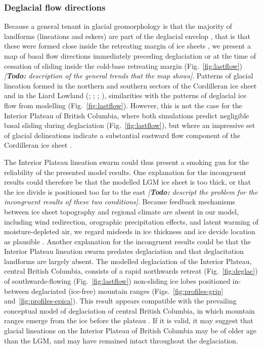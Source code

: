 \documentclass[tc, manuscript]{copernicus}
\newcommand{\todo}[1]{\emph{[\textbf{Todo:} #1]}}
\begin{document}
\subsubsection{Deglacial flow directions}

Because a general tenant in glacial geomorphology is that the majority of
landforms (lineations and eskers) are part of the deglacial envelop
\citep[terminology from]{Kleman.etal.2006}, that is that these were formed
close inside the retreating margin of ice sheets \citep{Boulton.Clark.1990,
Kleman.etal.1997, Kleman.etal.2010}, we present a map of basal flow directions
immediately preceding deglaciation or at the time of cessation of sliding
inside the cold-base retreating margin (Fig.~\ref{fig:lastflow})
\todo{description of the general trends that the map shows}. Patterns of
glacial lineation formed in the northern and southern sectors of the
Cordilleran ice sheet and in the Liard Lowland (\citealp{Prest.etal.1968};
\citealp[Fig.~1.12]{Clague.1989}; \citealp[Fig.~2]{Kleman.etal.2010};
\citealp[Fig.~2]{Margold.etal.2013}), similarities with the patterns of
deglacial ice flow from modelling (Fig.~\ref{fig:lastflow}). However, this is
not the case for the Interior Plateau of British Columbia, where both
simulations predict negligible basal sliding during deglaciation
(Fig.~\ref{fig:lastflow}), but where an impressive set of glacial delineations
indicate a substantial eastward flow component of the Cordilleran ice sheet
\citep{Prest.etal.1968, Kleman.etal.2010}.

The Interior Plateau lineation swarm could thus present a smoking gun for the
reliability of the presented model results. One explanation for the incongruent
results could therefore be that the modelled LGM ice sheet is too thick, or
that the ice divide is positioned too far to the east \todo{descript the
problem for the incongruent results of these two conditions}. Because feedback
mechanisms between ice sheet topography and regional climate are absent in our
model, including wind redirection, orographic precipitation effects, and latent
warming of moisture-depleted air, we regard misfeeds in ice thickness and ice
devide location as plausible \citep{Seguinot.etal.2014}. Another explanation
for the incongruent results could be that the Interior Plateau lineation swarm
predates deglaciation and that deglacitation landforms are largely absent. The
modelled deglaciation of the Interior Plateau, central British Columbia,
consists of a rapid northwards retreat (Fig.~\ref{fig:deglac}) of
southwards-flowing (Fig.~\ref{fig:lastflow}) non-sliding ice lobes positioned
in-between deglaciated (ice-free) mountain ranges
(Figs.~\ref{fig:profiles-grip} and~\ref{fig:profiles-epica}). This result
appears compatible with the prevailing conceptual model of deglaciation of
central British Columbia, in which mountain ranges emerge from the ice before
the plateau \citep[Fig.~7]{Fulton.1991}. If it is valid, it may suggest that
glacial lineations on the Interior Plateau of British Columbia may be of older
age than the LGM, and may have remained intact throughout the deglaciation.
\end{document}
